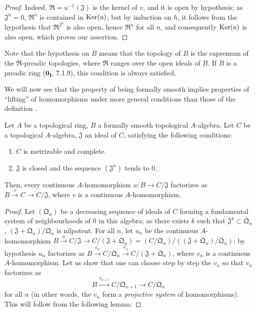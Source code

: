 \begin{proof}
Indeed, $\mathfrak{R}=u^{-1}(\mathfrak{J})$ is the kernel of $v$, and it is open by hypothesis;
as $\mathfrak{J}^n=0$, $\mathfrak{R}^n$ is contained in $\operatorname{Ker}(u)$;
but by induction on $h$, it follows from the hypothesis that $\mathfrak{R}^{2^h}$ is also open, hence $\mathfrak{R}^n$ for all $n$, and consequently $\operatorname{Ker}(u)$ is also open, which proves our assertion.
\end{proof}

Note that the hypothesis on $B$ means that the topology of $B$ is the
supremum of the $\mathfrak{R}$-preadic topologies, where $\mathfrak{R}$ ranges
over the open ideals of $B$. If $B$ is a preadic ring ($\mathbf{0_I}$, 7.1.9),
this condition is always satisfied.

\begin{env}[19.3.9]
\label{0.19.3.9}
We will now see that the property of being formally smooth implies properties of ``lifting'' of homomorphisms under more general conditions than those of the definition .
\end{env}


\begin{proposition}[19.3.10]
\label{0.19.3.10}
Let $A$ be a topological ring, $B$ a formally smooth topological $A$-algebra.
Let $C$ be a topological $A$-algebra, $\mathfrak{J}$ an ideal of $C$, satisfying the following conditions:
\begin{enumerate}
  \item[$1^\circ$] $C$ is metrizable and complete.
  \item[$2^\circ$] $\mathfrak{J}$ is closed and the sequence $(\mathfrak{J}^n)$ tends to $0$.
\end{enumerate}
Then, every continuous $A$-homomorphism $u:B\to C/\mathfrak{J}$ factorizes as $B\xrightarrow{v}C\to C/\mathfrak{J}$, where $v$ is a continuous $A$-homomorphism.
\end{proposition}

\begin{proof}
Let $(\mathfrak{Q}_n)$ be a decreasing sequence of ideals of $C$ forming a fundamental system of neighbourhoods of $0$ in this algebra;
as there exists $k$ such that $\mathfrak{J}^k\subset\mathfrak{Q}_n$, $(\mathfrak{J}+\mathfrak{Q}_n)/\mathfrak{Q}_n$ is nilpotent.
For all $n$, let $u_n$ be the continuous $A$-homomorphism $B\xrightarrow{u}C/\mathfrak{J}\to C/(\mathfrak{J}+\mathfrak{Q}_n)=(C/\mathfrak{Q}_n)/((\mathfrak{J}+\mathfrak{Q}_n)/\mathfrak{Q}_n)$;
by hypothesis $u_n$ factorizes as $B\xrightarrow{v_n}C/\mathfrak{Q}_n\xrightarrow{\varphi_n}C/(\mathfrak{J}+\mathfrak{Q}_n)$, where $v_n$ is a continuous $A$-homomorphism.
Let us show that one can choose step by step the $v_n$ so that $v_n$ factorizes as
\[
  B\xrightarrow{v_{n+1}}C/\mathfrak{Q}_{n+1}\to C/\mathfrak{Q}_n
\]
for all $n$ (in other words, the $v_n$ form a \emph{projective system} of homomorphisms).
This will follow from the following lemma:
\end{proof}

